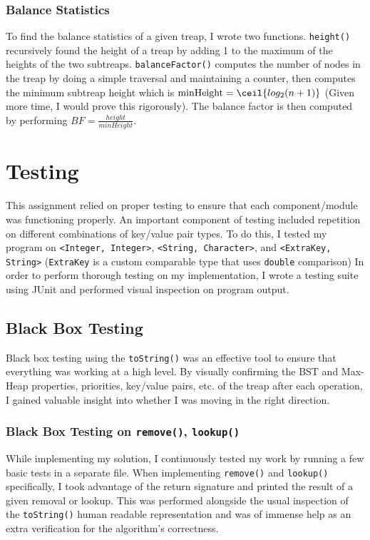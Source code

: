 \documentclass[11pt]{article}
\def\tt{\texttt}
\def\lu{\tt{lookup()}}
\def\rem{\tt{remove()}}
\begin{document}
\subsubsection{Balance Statistics}
To find the balance statistics of a given treap, I wrote two functions. \tt{height()} recursively found the height of a treap by adding 1 to the maximum of the heights of the two subtreaps. \tt{balanceFactor()} computes the number of nodes in the treap by doing a simple traversal and maintaining a counter, then computes the minimum subtreap height which is $\mathrm{minHeight} = \ceil{log_2(n+1)}$ (Given more time, I would prove this rigorously). The balance factor is then computed by performing $BF = \frac{height}{minHeight}$.

\section{Testing}
This assignment relied on proper testing to ensure that each component/module was functioning properly. An important component of testing included repetition on different combinations of key/value pair types. To do this, I tested my program on \tt{<Integer, Integer>}, \tt{<String, Character>}, and \tt{<ExtraKey, String>} (\tt{ExtraKey} is a custom comparable type that uses \tt{double} comparison)
In order to perform thorough testing on my implementation, I wrote a testing suite using JUnit and performed visual inspection on program output. 
\subsection{Black Box Testing}
Black box testing using the \tt{toString()} was an effective tool to ensure that everything was working at a high level. By visually confirming the BST and Max-Heap properties, priorities, key/value pairs, etc. of the treap after each operation, I gained valuable insight into whether I was moving in the right direction.
\subsubsection{Black Box Testing on \rem, \lu}
While implementing my solution, I continuously tested my work by running a few basic tests in a separate file. When implementing \rem{} and \lu{} specifically, I took advantage of the return signature and printed the result of a given removal or lookup. This was performed alongside the usual inspection of the \tt{toString()} human readable representation and was of immense help as an extra verification for the algorithm's correctness. 
\end{document}
